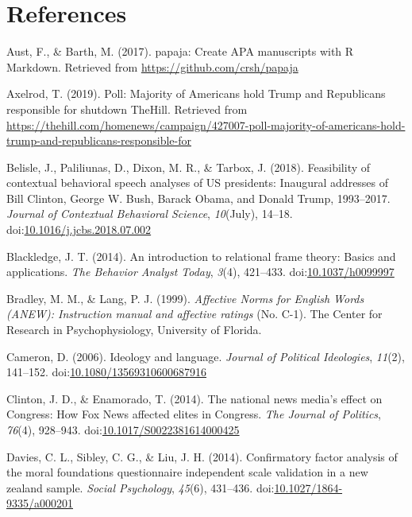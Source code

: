 \documentclass[english,,man]{apa6}
\begin{document}
\newpage

\section{References}\label{references}

\begingroup
\setlength{\parindent}{-0.5in} \setlength{\leftskip}{0.5in}

\hypertarget{refs}{}
\hypertarget{ref-Aust2017}{}
Aust, F., \& Barth, M. (2017). papaja: Create APA manuscripts with R
Markdown. Retrieved from \url{https://github.com/crsh/papaja}

\hypertarget{ref-Axelrod2019}{}
Axelrod, T. (2019). Poll: Majority of Americans hold Trump and
Republicans responsible for shutdown \textbar{} TheHill. Retrieved from
\url{https://thehill.com/homenews/campaign/427007-poll-majority-of-americans-hold-trump-and-republicans-responsible-for}

\hypertarget{ref-Belisle2018}{}
Belisle, J., Paliliunas, D., Dixon, M. R., \& Tarbox, J. (2018).
Feasibility of contextual behavioral speech analyses of US presidents:
Inaugural addresses of Bill Clinton, George W. Bush, Barack Obama, and
Donald Trump, 1993--2017. \emph{Journal of Contextual Behavioral
Science}, \emph{10}(July), 14--18.
doi:\href{https://doi.org/10.1016/j.jcbs.2018.07.002}{10.1016/j.jcbs.2018.07.002}

\hypertarget{ref-Blackledge2014}{}
Blackledge, J. T. (2014). An introduction to relational frame theory:
Basics and applications. \emph{The Behavior Analyst Today}, \emph{3}(4),
421--433. doi:\href{https://doi.org/10.1037/h0099997}{10.1037/h0099997}

\hypertarget{ref-Bradley1999}{}
Bradley, M. M., \& Lang, P. J. (1999). \emph{Affective Norms for English
Words (ANEW): Instruction manual and affective ratings} (No. C-1). The
Center for Research in Psychophysiology, University of Florida.

\hypertarget{ref-Cameron2006}{}
Cameron, D. (2006). Ideology and language. \emph{Journal of Political
Ideologies}, \emph{11}(2), 141--152.
doi:\href{https://doi.org/10.1080/13569310600687916}{10.1080/13569310600687916}

\hypertarget{ref-Clinton2014}{}
Clinton, J. D., \& Enamorado, T. (2014). The national news media's
effect on Congress: How Fox News affected elites in Congress. \emph{The
Journal of Politics}, \emph{76}(4), 928--943.
doi:\href{https://doi.org/10.1017/S0022381614000425}{10.1017/S0022381614000425}

\hypertarget{ref-Davies2014}{}
Davies, C. L., Sibley, C. G., \& Liu, J. H. (2014). Confirmatory factor
analysis of the moral foundations questionnaire independent scale
validation in a new zealand sample. \emph{Social Psychology},
\emph{45}(6), 431--436.
doi:\href{https://doi.org/10.1027/1864-9335/a000201}{10.1027/1864-9335/a000201}
\end{document}
